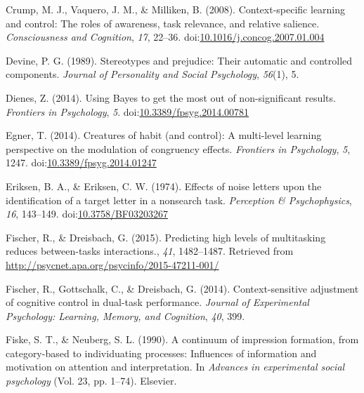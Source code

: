 \documentclass[english,,man,floatsintext]{apa6}
\begin{document}
\leavevmode\hypertarget{ref-crump_context-specific_2008}{}%
Crump, M. J., Vaquero, J. M., \& Milliken, B. (2008). Context-specific learning and control: The roles of awareness, task relevance, and relative salience. \emph{Consciousness and Cognition}, \emph{17}, 22--36. doi:\href{https://doi.org/10.1016/j.concog.2007.01.004}{10.1016/j.concog.2007.01.004}

\leavevmode\hypertarget{ref-devine_stereotypes_1989}{}%
Devine, P. G. (1989). Stereotypes and prejudice: Their automatic and controlled components. \emph{Journal of Personality and Social Psychology}, \emph{56}(1), 5.

\leavevmode\hypertarget{ref-dienes_using_2014}{}%
Dienes, Z. (2014). Using Bayes to get the most out of non-significant results. \emph{Frontiers in Psychology}, \emph{5}. doi:\href{https://doi.org/10.3389/fpsyg.2014.00781}{10.3389/fpsyg.2014.00781}

\leavevmode\hypertarget{ref-egner_creatures_2014}{}%
Egner, T. (2014). Creatures of habit (and control): A multi-level learning perspective on the modulation of congruency effects. \emph{Frontiers in Psychology}, \emph{5}, 1247. doi:\href{https://doi.org/10.3389/fpsyg.2014.01247}{10.3389/fpsyg.2014.01247}

\leavevmode\hypertarget{ref-eriksen_effects_1974}{}%
Eriksen, B. A., \& Eriksen, C. W. (1974). Effects of noise letters upon the identification of a target letter in a nonsearch task. \emph{Perception \& Psychophysics}, \emph{16}, 143--149. doi:\href{https://doi.org/10.3758/BF03203267}{10.3758/BF03203267}

\leavevmode\hypertarget{ref-fischer_predicting_2015}{}%
Fischer, R., \& Dreisbach, G. (2015). Predicting high levels of multitasking reduces between-tasks interactions., \emph{41}, 1482--1487. Retrieved from \url{http://psycnet.apa.org/psycinfo/2015-47211-001/}

\leavevmode\hypertarget{ref-fischer_context-sensitive_2014}{}%
Fischer, R., Gottschalk, C., \& Dreisbach, G. (2014). Context-sensitive adjustment of cognitive control in dual-task performance. \emph{Journal of Experimental Psychology: Learning, Memory, and Cognition}, \emph{40}, 399.

\leavevmode\hypertarget{ref-fiske_continuum_1990}{}%
Fiske, S. T., \& Neuberg, S. L. (1990). A continuum of impression formation, from category-based to individuating processes: Influences of information and motivation on attention and interpretation. In \emph{Advances in experimental social psychology} (Vol. 23, pp. 1--74). Elsevier.
\end{document}
